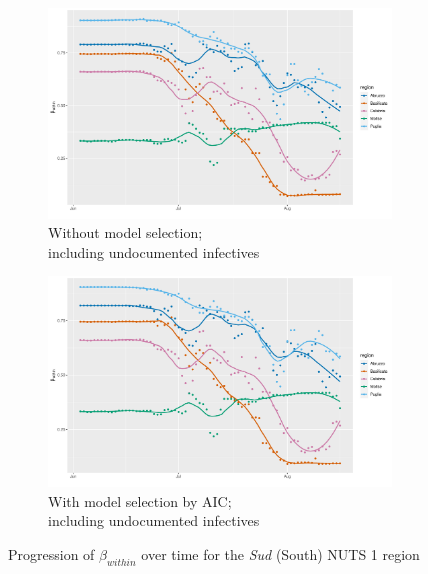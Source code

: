 \documentclass[12pt]{article}
\begin{document}
\begin{appendices}
\begin{figure}[H]
\begin{subfigure}{\textwidth}
    	      \includegraphics[width=0.95\linewidth]{output/model1_lag3_betawithin_Sud_UndocQuadratic_rolling.pdf}
    	      \caption{Without model selection; \\ including undocumented infectives}
    	      \label{fig:beta_within_over_time_sud_regular_undoc}
    	    \end{subfigure}\newline
    	    \begin{subfigure}{\textwidth}
    	      \centering
    	      \includegraphics[width=0.95\linewidth]{output/model1_lag3_betawithin_Sud_aic_UndocQuadratic_rolling.pdf}
    	      \caption{With model selection by AIC; \\ including undocumented infectives}
    	      \label{fig:beta_within_over_time_sud_aic_undoc}
    	    \end{subfigure}
    	    \caption{Progression of $\beta_{within}$ over time for the \textit{Sud} (South) NUTS 1 region}
    	    \label{fig:beta_within_over_time_sud}
	    \end{figure}
		

\end{appendices}
\end{document}
